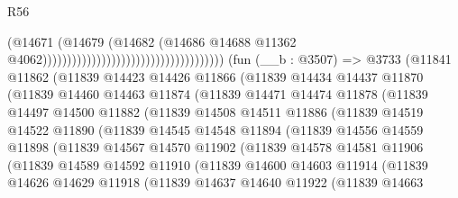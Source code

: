 \begin{lexlean}{R56}
\begin{coremodule}
                                                                      (@14671
                                                                        (@14679
                                                                          (@14682
                                                                            (@14686
                                                                              @14688
                                                                              @11362
                                                                              @4062)))))))))))))))))))))))))))))))))))))
    (fun (__b : @3507) =>
    @3733
      (@11841
        @11862
        (@11839
          @14423
          @14426
          @11866
          (@11839
            @14434
            @14437
            @11870
            (@11839
              @14460
              @14463
              @11874
              (@11839
                @14471
                @14474
                @11878
                (@11839
                  @14497
                  @14500
                  @11882
                  (@11839
                    @14508
                    @14511
                    @11886
                    (@11839
                      @14519
                      @14522
                      @11890
                      (@11839
                        @14545
                        @14548
                        @11894
                        (@11839
                          @14556
                          @14559
                          @11898
                          (@11839
                            @14567
                            @14570
                            @11902
                            (@11839
                              @14578
                              @14581
                              @11906
                              (@11839
                                @14589
                                @14592
                                @11910
                                (@11839
                                  @14600
                                  @14603
                                  @11914
                                  (@11839
                                    @14626
                                    @14629
                                    @11918
                                    (@11839
                                      @14637
                                      @14640
                                      @11922
                                      (@11839
                                        @14663

\end{coremodule}
\end{lexlean}
